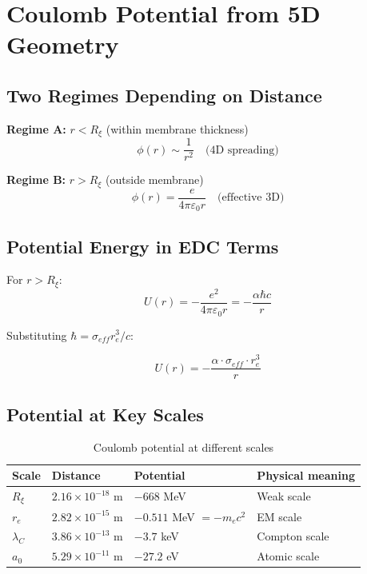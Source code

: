\documentclass[12pt,a4paper]{article}
\begin{document}
\section{Coulomb Potential from 5D Geometry}

\subsection{Two Regimes Depending on Distance}

\textbf{Regime A:} $r < R_\xi$ (within membrane thickness)
\begin{equation}
\phi(r) \sim \frac{1}{r^2} \quad \text{(4D spreading)}
\end{equation}

\textbf{Regime B:} $r > R_\xi$ (outside membrane)
\begin{equation}
\phi(r) = \frac{e}{4\pi\varepsilon_0 r} \quad \text{(effective 3D)}
\end{equation}

\subsection{Potential Energy in EDC Terms}

For $r > R_\xi$:
\begin{equation}
U(r) = -\frac{e^2}{4\pi\varepsilon_0 r} = -\frac{\alpha \hbar c}{r}
\end{equation}

Substituting $\hbar = \sigma_{eff} r_e^3 / c$:

\begin{keyresult}
\begin{equation}
\boxed{U(r) = -\frac{\alpha \cdot \sigma_{eff} \cdot r_e^3}{r}}
\end{equation}
\end{keyresult}

\subsection{Potential at Key Scales}

\begin{table}[h]
\centering
\begin{tabular}{@{}llll@{}}
\toprule
\textbf{Scale} & \textbf{Distance} & \textbf{Potential} & \textbf{Physical meaning} \\
\midrule
$R_\xi$ & $2.16 \times 10^{-18}$ m & $-668$ MeV & Weak scale \\
$r_e$ & $2.82 \times 10^{-15}$ m & $-0.511$ MeV $= -m_e c^2$ & EM scale \\
$\lambda_C$ & $3.86 \times 10^{-13}$ m & $-3.7$ keV & Compton scale \\
$a_0$ & $5.29 \times 10^{-11}$ m & $-27.2$ eV & Atomic scale \\
\bottomrule
\end{tabular}
\caption{Coulomb potential at different scales}
\end{table}
\end{document}
